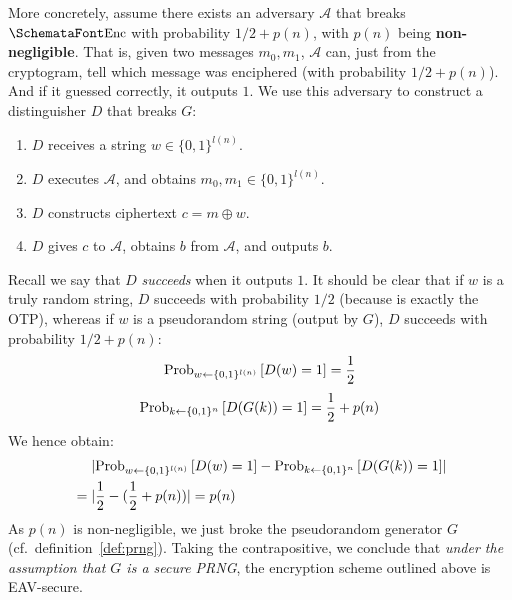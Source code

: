   More concretely, assume there exists an adversary $\mathcal{A}$ that breaks $\myemph{Enc}$ with probability $1/2 + p(n)$, with $p(n)$ being \textbf{non-negligible}. That is, given two messages $m_0, m_1$, $\mathcal{A}$ can, just from the cryptogram, tell which message was enciphered (with probability $1/2 + p(n)$). And if it guessed correctly, it outputs $1$. We use this adversary to construct a distinguisher $D$ that breaks $G$:
  \begin{enumerate}
    \item $D$ receives a string $w\in \{0, 1\}^{l(n)}$.
    \item $D$ executes $\mathcal{A}$, and obtains $m_0, m_1\in \{0, 1\}^{l(n)}$.
    \item $D$ constructs ciphertext $c = m \oplus w$.
    \item $D$ gives $c$ to $\mathcal{A}$, obtains $b$ from $\mathcal{A}$, and outputs $b$.
  \end{enumerate}
  Recall we say that $D$ \emph{succeeds} when it outputs $1$. It should be clear that if $w$ is a truly random string, $D$ succeeds with probability $1/2$ (because  is exactly the OTP), whereas if $w$ is a pseudorandom string (output by $G$), $D$ succeeds with probability $1/2 + p(n)$:
  \begin{equation}
    \textup{Prob}_{w \leftarrow \{0, 1\}^{l(n)}}\left[D(w) = 1\right] = \frac{1}{2}
  \end{equation}
  \begin{equation}
    \textup{Prob}_{k \leftarrow \{0, 1\}^{n}}\left[D(G(k)) = 1\right] = \frac{1}{2} + p(n)
  \end{equation}
  We hence obtain:
  \begin{align}
    &\phantom{{}={}}\abs{\textup{Prob}_{w \leftarrow \{0, 1\}^{l(n)}}\left[D(w) = 1\right] - \textup{Prob}_{k \leftarrow \{0, 1\}^{n}}\left[D(G(k)) = 1\right]} \\
    &= \abs{\frac{1}{2} - \parens{\frac{1}{2} + p(n)}} = p(n)
  \end{align}
  As $p(n)$ is non-negligible, we just broke the pseudorandom generator $G$ (cf.\ definition~\ref{def:prng}). Taking the contrapositive, we conclude that \emph{under the assumption that $G$ is a secure PRNG}, the encryption scheme outlined above is EAV-secure.

